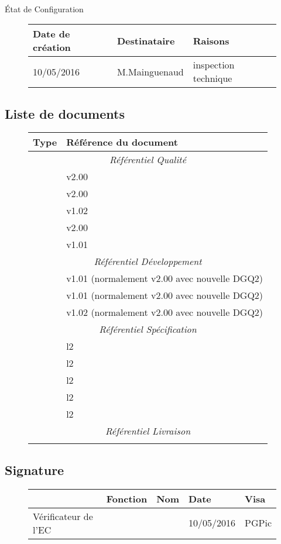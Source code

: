 \documentclass[asi, sansVersion]{picInsa}
\begin{document}
\begin{center}
\huge
\nomEquipe{}\\
État de Configuration\\
\end{center}
\vspace{0.5cm}


\begin{figure}[H]
		\centering
		\begin{tabularx}{17cm}{|p{4cm}|X|X|}
		\hline
		\rowcolor[gray]{0.85}Date de création & Destinataire & Raisons \\
		\hline
		10/05/2016 & M.Mainguenaud & inspection technique \\
		\hline
		\end{tabularx}
\end{figure}

\subsection*{Liste de documents}

\begin{figure}[H]
		\centering
		\begin{tabularx}{17cm}{|p{7cm}|X|}
		\hline
		\rowcolor[gray]{0.85}Type & Référence du document\\
		\hline
		\multicolumn{2}{|c|}{\textit{Référentiel Qualité}}\\
		\hline
		 \PGC & v2.00 \\
		 \PQ & v2.00 \\
		 \PF & v1.02 \\
		 \PRO & v2.00 \\
		 \OF & v1.01 \\
		\hline
		\multicolumn{2}{|c|}{\textit{Référentiel Développement}}\\
		\hline 
		 \DSE & v1.01 (normalement v2.00 avec nouvelle DGQ2) \\
		 \DSI & v1.01 (normalement v2.00 avec nouvelle DGQ2) \\
		 \PTV & v1.02 (normalement v2.00 avec nouvelle DGQ2) \\		 	 
		\hline 
		\multicolumn{2}{|c|}{\textit{Référentiel Spécification}}\\
		\hline
		 \PTU & l2 \\
		 \JTU & l2 \\
		 \PTI & l2 \\
		 \JTI & l2 \\
		 \DCP & l2 \\		 	 		 		 		 
		\hline 
		\multicolumn{2}{|c|}{\textit{Référentiel Livraison}}\\
		\hline
		& \\
		\hline 
		\end{tabularx}
\end{figure}

\subsection*{Signature}

\begin{figure}[H]
		\centering
		\begin{tabularx}{17cm}{|p{4cm}|X|X|X|X|}
		\hline
		\rowcolor[gray]{0.85}& Fonction & Nom & Date & Visa \\
		\hline
		 Vérificateur de l'EC & \RGC & \Mathieu & 10/05/2016 & PGPic \\
		\hline
		\end{tabularx}
\end{figure}
\end{document}
